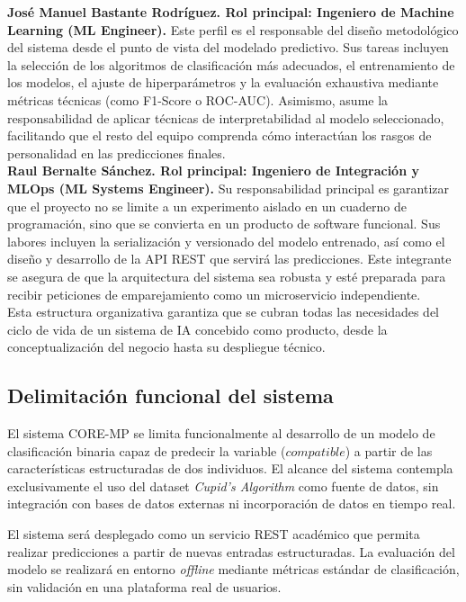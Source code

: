 \textbf{José Manuel Bastante Rodríguez. Rol principal: Ingeniero de Machine Learning (ML Engineer).} Este perfil es el responsable del diseño metodológico del sistema desde el punto de vista del modelado predictivo. Sus tareas incluyen la selección de los algoritmos de clasificación más adecuados, el entrenamiento de los modelos, el ajuste de hiperparámetros y la evaluación exhaustiva mediante métricas técnicas (como F1-Score o ROC-AUC). Asimismo, asume la responsabilidad de aplicar técnicas de interpretabilidad al modelo seleccionado, facilitando que el resto del equipo comprenda cómo interactúan los rasgos de personalidad en las predicciones finales.\\

\textbf{Raul Bernalte Sánchez. Rol principal: Ingeniero de Integración y MLOps (ML Systems Engineer).} Su responsabilidad principal es garantizar que el proyecto no se limite a un experimento aislado en un cuaderno de programación, sino que se convierta en un producto de software funcional. Sus labores incluyen la serialización y versionado del modelo entrenado, así como el diseño y desarrollo de la API REST que servirá las predicciones. Este integrante se asegura de que la arquitectura del sistema sea robusta y esté preparada para recibir peticiones de emparejamiento como un microservicio independiente.\\

Esta estructura organizativa garantiza que se cubran todas las necesidades del ciclo de vida de un sistema de IA concebido como producto, desde la conceptualización del negocio hasta su despliegue técnico.

\subsection{Delimitación funcional del sistema}
El sistema CORE-MP se limita funcionalmente al desarrollo de un modelo de clasificación binaria capaz de predecir la variable ($compatible$) a partir de las características estructuradas de dos individuos. El alcance del sistema contempla exclusivamente el uso del dataset \textit{Cupid’s Algorithm} como fuente de datos, sin integración con bases de datos externas ni incorporación de datos en tiempo real.

El sistema será desplegado como un servicio REST académico que permita realizar predicciones a partir de nuevas entradas estructuradas. La evaluación del modelo se realizará en entorno \textit{offline} mediante métricas estándar de clasificación, sin validación en una plataforma real de usuarios.

